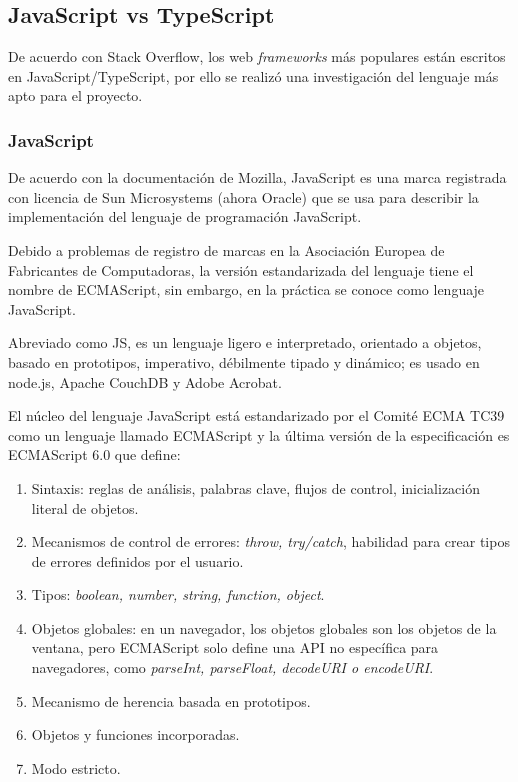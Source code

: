 \subsection{JavaScript vs TypeScript}

De acuerdo con Stack Overflow\cite{noauthor_most_nodate}, los web \textit{frameworks} más populares están escritos en JavaScript/TypeScript, por ello se realizó una investigación del lenguaje más apto para el proyecto.

\subsubsection*{JavaScript}
De acuerdo con la documentación de Mozilla\cite{noauthor_javascript_nodate}, JavaScript es una marca registrada con licencia de Sun Microsystems (ahora Oracle) que se usa para describir la implementación del lenguaje de programación JavaScript.


Debido a problemas de registro de marcas en la Asociación Europea de Fabricantes de Computadoras, la versión estandarizada del lenguaje tiene el nombre de ECMAScript, sin embargo, en la práctica se conoce como lenguaje JavaScript. 


Abreviado como JS, es un lenguaje ligero e interpretado, orientado a objetos, basado en prototipos, imperativo, débilmente tipado y dinámico; es usado en node.js, Apache CouchDB y Adobe Acrobat.


El núcleo del lenguaje JavaScript está estandarizado por el Comité ECMA TC39 como un lenguaje llamado ECMAScript y la última versión de la especificación es ECMAScript 6.0 que define: 

\begin{enumerate}
    \item Sintaxis: reglas de análisis, palabras clave, flujos de control, inicialización literal de objetos.
    \item Mecanismos de control de errores: \textit{throw, try/catch}, habilidad para crear tipos de errores definidos por el usuario.
    \item Tipos: \textit{boolean, number, string, function, object}.
    \item  Objetos globales: en un navegador, los objetos globales son los objetos de la ventana, pero ECMAScript solo define una API no específica para navegadores, como \textit{parseInt, parseFloat, decodeURI o encodeURI}.
    \item Mecanismo de herencia basada en prototipos.
    \item Objetos y funciones incorporadas.
    \item Modo estricto.
\end{enumerate}

